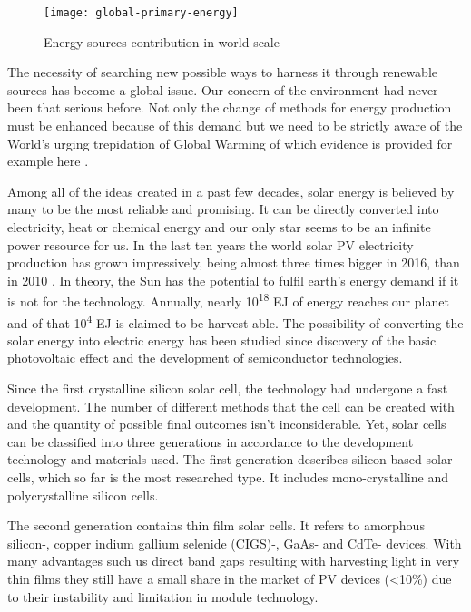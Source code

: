 \begin{figure}[H]
\centering
\texttt{[image: global-primary-energy]}
\caption{Energy sources contribution in world scale
\cite{2019}}
\label{fig:ensour}
\end{figure}

\noindent The necessity of searching new possible ways to harness it through renewable sources has become a global issue. Our concern of the environment had never been that serious before. Not only the change of methods for energy production must be enhanced because of this demand but we need to be strictly aware of the World's urging trepidation of Global Warming of which evidence is provided for example here \cite{Nasa2019}.

\newpage

\noindent Among all of the ideas created in a past few decades, solar energy is
believed by many to be the most reliable and promising. It can be
directly converted into electricity, heat or chemical energy and our
only star seems to be an infinite power resource for us. In the last ten
years the world solar PV electricity production has grown impressively,
being almost three times bigger in 2016, than in 2010 \cite{2018}. In theory,
the Sun has the potential to fulfil earth's energy demand if it is not
for the technology. Annually, nearly 10\textsuperscript{18} EJ of energy
reaches our planet and of that 10\textsuperscript{4} EJ is claimed to be
harvest-able. The possibility of converting the solar energy into
electric energy has been studied since discovery of the basic
photovoltaic effect and the development of semiconductor technologies.

\noindent Since the first crystalline silicon solar cell, the technology had undergone a fast development. The number of different methods that the cell can be created with and the quantity of possible final outcomes isn't inconsiderable. Yet, solar cells can be classified into three generations in accordance to the development technology and materials used. \cite{HuashangRao2018} The first generation describes silicon based solar cells, which so far is the most researched type. It includes mono-crystalline and polycrystalline silicon cells.

\noindent The second generation contains thin film solar cells. It refers to amorphous silicon-, copper indium gallium selenide (CIGS)-, GaAs- and CdTe- devices. With many advantages such us direct band gaps resulting with harvesting light in very thin films they still have a small share in the market of PV devices (<10\%) due to their instability and limitation in module technology. \cite{HuashangRao2018}

